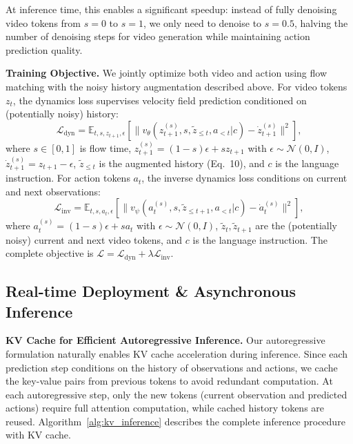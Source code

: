 \documentclass[onecolumn]{robbyant}           %
\begin{document}
At inference time, this enables a significant speedup: instead of fully denoising video tokens from $s=0$ to $s=1$, we only need to denoise to $s=0.5$, halving the number of denoising steps for video generation while maintaining action prediction quality.



\noindent\textbf{Training Objective.}
We jointly optimize both video and action using flow matching with the noisy history augmentation described above.
For video tokens $z_t$, the dynamics loss supervises velocity field prediction conditioned on (potentially noisy) history:
\begin{equation}
\mathcal{L}_{\mathrm{dyn}} = \mathbb{E}_{t, s, z_{t+1}, \epsilon} \left[ \| v_\theta(z_{t+1}^{(s)}, s ,  \tilde{z}_{\leq t}, a_{<t} | c) - \dot{z}_{t+1}^{(s)} \|^2 \right],
\end{equation}
where $s \in [0,1]$ is flow time, $z_{t+1}^{(s)} = (1-s)\epsilon + sz_{t+1}$ with $\epsilon \sim \mathcal{N}(0, I)$, $\dot{z}_{t+1}^{(s)} = z_{t+1} - \epsilon$, $\tilde{z}_{\leq t}$ is the augmented history (Eq.~10), and $c$ is the language instruction.
For action tokens $a_t$, the inverse dynamics loss conditions on current and next observations:
\begin{equation}
\mathcal{L}_{\mathrm{inv}} = \mathbb{E}_{t, s, a_t, \epsilon} \left[ \| v_\psi(a_t^{(s)}, s, \tilde{z}_{\leq t+1}, a_{<t} | c) - \dot{a}_t^{(s)} \|^2 \right],
\end{equation}
where $a_t^{(s)} = (1-s)\epsilon + sa_t$ with $\epsilon \sim \mathcal{N}(0, I)$, $\tilde{z}_{t}, \tilde{z}_{t+1}$ are the (potentially noisy) current and next video tokens, and $c$ is the language instruction.
The complete objective is $\mathcal{L} = \mathcal{L}_{\mathrm{dyn}} + \lambda \mathcal{L}_{\mathrm{inv}}$.




\subsection{Real-time Deployment \& Asynchronous Inference}
\label{sec:inference}

\noindent\textbf{KV Cache for Efficient Autoregressive Inference.}
Our autoregressive formulation naturally enables KV cache acceleration during inference.
Since each prediction step conditions on the history of observations and actions, we cache the key-value pairs from previous tokens to avoid redundant computation.
At each autoregressive step, only the new tokens (current observation and predicted actions) require full attention computation, while cached history tokens are reused.
Algorithm~\ref{alg:kv_inference} describes the complete inference procedure with KV cache.
\end{document}
